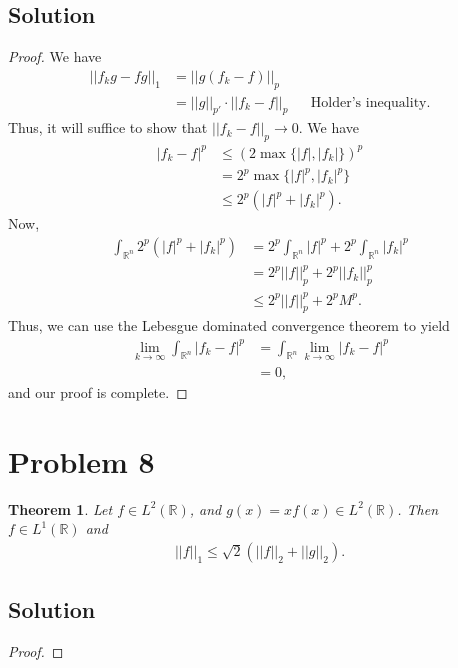 \documentclass[10pt,a4paper]{article}
\theoremstyle{theorem}
\newtheorem{theorem}{Theorem}
\theoremstyle{definition}
\begin{document}
\subsection*{Solution}
\begin{proof}
We have
\begin{align*}
||f_k g - f g ||_1 &= ||g(f_k - f)||_p\\
&= ||g||_{p'} \cdot ||f_k - f||_p &&\text{Holder's inequality.}
\end{align*}
Thus, it will suffice to show that $||f_k - f||_p \to 0$. We have
\begin{align*}
|f_k - f|^p &\leq (2 \max\{|f|, |f_k|\})^p\\
&= 2^p \max\{|f|^p, |f_k|^p\}\\
&\leq 2^p (|f|^p + |f_k|^p).
\end{align*}
Now, 
\begin{align*}
\int_{\mathbb{R}^n} 2^p (|f|^p + |f_k|^p) &= 2^p \int_{\mathbb{R}^n}|f|^p + 2^p \int_{\mathbb{R}^n}|f_k|^p\\
&= 2^p ||f||_p^p + 2^p ||f_k||_p^p\\
&\leq 2^p ||f||_p^p + 2^p M^p.
\end{align*}
Thus, we can use the Lebesgue dominated convergence theorem to yield
\begin{align*}
\lim_{k \to \infty} \int_{\mathbb{R}^n} |f_k - f|^p &= \int_{\mathbb{R}^n} \lim_{k \to \infty} |f_k - f|^p\\
&= 0,
\end{align*}
and our proof is complete.
\end{proof}

\section*{Problem 8}
\begin{theorem}
Let $f \in L^2 (\mathbb{R})$, and $g(x) = x f(x) \in L^2 (\mathbb{R})$. Then $f \in L^1 (\mathbb{R})$ and 
\begin{align*}
||f||_1 \leq \sqrt{2}(||f||_2 + ||g||_2).
\end{align*}
\end{theorem}

\subsection*{Solution}
\begin{proof}

\end{proof}
\end{document}

